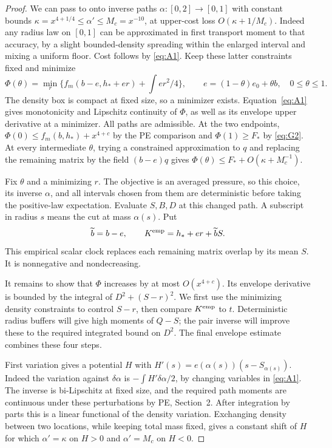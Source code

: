 \begin{proof}
We can pass to onto inverse paths \(\alpha:[0,2]\to[0,1]\) with constant bounds
\(\kappa=x^{4+1/4}\le\alpha'\le M_c=x^{-10}\), at upper-cost loss \(O(\kappa+1/M_c)\). Indeed any radius law on \([0,1]\) can be approximated in first transport moment to that accuracy, by a slight bounded-density spreading within the enlarged interval and mixing a uniform floor. Cost follows by \eqref{eq:A1}. Keep these latter constraints fixed and minimize
\[
 \Phi(\theta)=\min_r\{f_m(b-e,h_*+e r)+\textstyle\int e r^2/4\},\qquad
 e=(1-\theta)e_0+\theta b,\quad 0\le\theta\le1 .
\]
The density box is compact at fixed size, so a minimizer exists.
Equation~\eqref{eq:A1} gives monotonicity and Lipschitz continuity
of \(\Phi\), as well as its envelope upper derivative at a
minimizer. All paths are admissible. At the two endpoints,
\(\Phi(0)\le f_m(b,h_*)+x^{4+c}\) by the PE comparison and
\(\Phi(1)\ge F_*\) by \eqref{eq:G2}. At every intermediate
\(\theta\), trying a constrained approximation to \(q\) and
replacing the remaining matrix by the field \((b-e)q\) gives
\(\Phi(\theta)\le F_*+O(\kappa+M_c^{-1})\).

Fix \(\theta\) and a minimizing \(r\). The objective is an averaged
pressure, so this choice, its inverse \(\alpha\), and all intervals
chosen from them are deterministic before taking the positive-law
expectation. Evaluate \(S,B,D\) at this changed path. A subscript in
radius \(s\) means the cut at mass \(\alpha(s)\). Put
\[
 \widetilde b=b-e,\qquad
 K^{\rm emp}=h_*+er+\widetilde bS.
\]
This empirical scalar clock replaces each remaining matrix overlap by
its mean \(S\). It is nonnegative and nondecreasing.

It remains to show that \(\Phi\) increases by at most
\(O(x^{4+c})\). Its envelope derivative is bounded by the integral
of \(D^2+(S-r)^2\). We first use the minimizing density constraints
to control \(S-r\), then compare \(K^{\rm emp}\) to \(t\).
Deterministic radius buffers will give high moments of \(Q-S\);
the pair inverse will improve these to the required integrated bound
on \(D^2\). The final envelope estimate combines these four steps.

First variation gives a potential \(H\) with
\(H'(s)=e(\alpha(s))(s-S_{\alpha(s)})\). Indeed the variation against
\(\delta\alpha\) is \(-\int H'\delta\alpha/2\), by changing variables
in \eqref{eq:A1}. The inverse is bi-Lipschitz at fixed size, and the
required path moments are continuous under these perturbations by PE,
Section~2. After integration by parts this is a linear functional of
the density variation. Exchanging density between two locations, while
keeping total mass fixed, gives a constant shift of \(H\) for which
\(\alpha'=\kappa\) on \(H>0\) and \(\alpha'=M_c\) on \(H<0\).


\end{proof}
